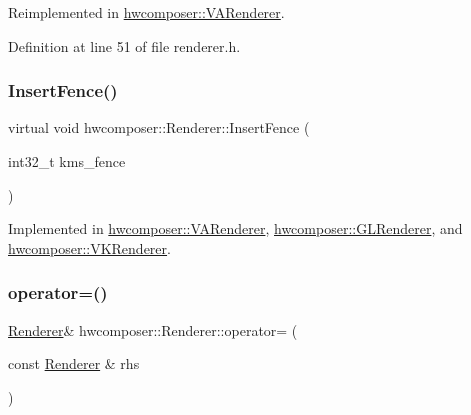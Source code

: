 Reimplemented in \mbox{\hyperlink{classhwcomposer_1_1VARenderer_a93d5e911647cee44c892222c822df619}{hwcomposer\+::\+V\+A\+Renderer}}.



Definition at line 51 of file renderer.\+h.


\begin{DoxyCode}{0}
\end{DoxyCode}
\mbox{\label{classhwcomposer_1_1Renderer_a0b7be67ed8f89c994cf3bcfd418ef0a4}} 
\subsubsection{\texorpdfstring{Insert\+Fence()}{InsertFence()}}
{\footnotesize\ttfamily virtual void hwcomposer\+::\+Renderer\+::\+Insert\+Fence (\begin{DoxyParamCaption}\item[{int32\+\_\+t}]{kms\+\_\+fence }\end{DoxyParamCaption})\hspace{0.3cm}{\ttfamily [pure virtual]}}



Implemented in \mbox{\hyperlink{classhwcomposer_1_1VARenderer_aece2e9617febe0b91087342ce84812e2}{hwcomposer\+::\+V\+A\+Renderer}}, \mbox{\hyperlink{classhwcomposer_1_1GLRenderer_af9eecc3a31c3acadaae84d2b31cf4807}{hwcomposer\+::\+G\+L\+Renderer}}, and \mbox{\hyperlink{classhwcomposer_1_1VKRenderer_abbaf31607e1572de1e74de4d2ea50a03}{hwcomposer\+::\+V\+K\+Renderer}}.

\mbox{\label{classhwcomposer_1_1Renderer_ad3d7968f66d493cf0277a904781bb0f8}} 
\subsubsection{\texorpdfstring{operator=()}{operator=()}}
{\footnotesize\ttfamily \mbox{\hyperlink{classhwcomposer_1_1Renderer}{Renderer}}\& hwcomposer\+::\+Renderer\+::operator= (\begin{DoxyParamCaption}\item[{const \mbox{\hyperlink{classhwcomposer_1_1Renderer}{Renderer}} \&}]{rhs }\end{DoxyParamCaption})\hspace{0.3cm}{\ttfamily [delete]}}

